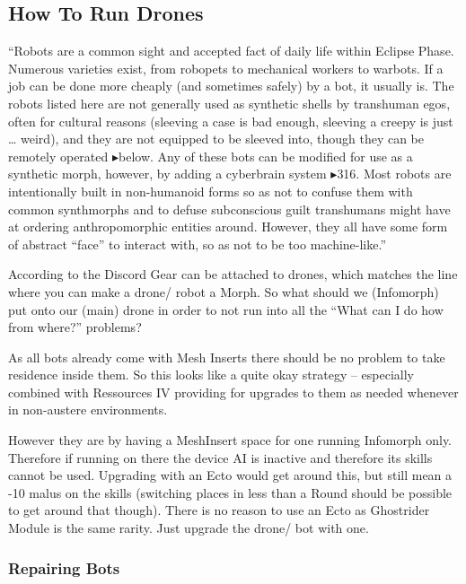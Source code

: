 
\subsection{How To Run Drones}

“Robots are a common sight and accepted fact of daily life within Eclipse Phase. Numerous varieties exist, from robopets to mechanical workers to warbots. If a job can be done more cheaply (and sometimes safely) by a bot, it usually is. The robots listed here are not generally used as synthetic shells by transhuman egos, often for cultural reasons (sleeving a case is bad enough, sleeving a creepy is just … weird), and they are not equipped to be sleeved into, though they can be remotely operated $\blacktriangleright$below. Any of these bots can be modified for use as a synthetic morph, however, by adding a cyberbrain system $\blacktriangleright$316. Most robots are intentionally built in non-humanoid forms so as not to confuse them with common synthmorphs and to defuse subconscious guilt transhumans might have at ordering anthropomorphic entities around. However, they all have some form of abstract “face” to interact with, so as not to be too machine-like.” \citep[pg. 346]{ep2e_1.1_2019}

According to the Discord Gear can be attached to drones, which matches the line where you can make a drone/ robot a Morph. So what should we (Infomorph) put onto our (main) drone in order to not run into all the “What can I do how from where?” problems?

As all bots already come with Mesh Inserts there should be no problem to take residence inside them. So this looks like a quite okay strategy -- especially combined with Ressources IV providing for upgrades to them as needed whenever in non-austere environments.

However they are by having a \gls{MeshInsert} space for one running Infomorph only. Therefore if running on there the device AI is inactive and therefore its skills cannot be used. \citep[pg. 244]{ep2e_1.1_2019} Upgrading with an \gls{Ecto} would get around this, but still mean a -10 malus on the skills (switching places in less than a Round should be possible to get around that though). There is no reason to use an \gls{Ecto} as \gls{Ghostrider Module} is the same rarity. Just upgrade the drone/ bot with one.

\subsubsection{Repairing Bots}


